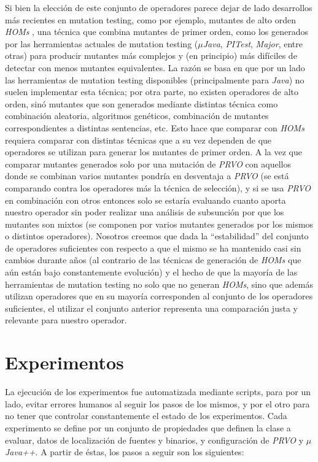 Si bien la elecci\'on de este conjunto de operadores parece dejar de lado desarrollos m\'as recientes en mutation testing, como por ejemplo, mutantes de alto orden \emph{HOMs} \cite{bibliography.mutation.highorder.Jia+09}, una t\'ecnica que combina mutantes de primer orden, como los generados por las herramientas actuales de mutation testing (\emph{$\mu$Java}, \emph{PITest}, \emph{Major}, entre otras) para producir mutantes m\'as complejos y (en principio) m\'as dif\'iciles de detectar con menos mutantes equivalentes. La raz\'on se basa en que por un lado las herramientas de mutation testing disponibles (principalmente para \emph{Java}) no suelen implementar esta t\'ecnica; por otra parte, no existen operadores de alto orden, sin\'o mutantes que son generados mediante distintas t\'ecnica como combinaci\'on aleatoria, algoritmos gen\'eticos, combinaci\'on de mutantes correspondientes a distintas sentencias, etc. Esto hace que comparar con \emph{HOMs} requiera comparar con distintas t\'ecnicas que a su vez dependen de que operadores se utilizan para generar los mutantes de primer orden. A la vez que comparar mutantes generados solo por una mutaci\'on de \emph{PRVO} con aquellos donde se combinan varios mutantes pondr\'ia en desventaja a \emph{PRVO} (se est\'a comparando contra los operadores m\'as la t\'ecnica de selecci\'on), y si se usa \emph{PRVO} en combinaci\'on con otros entonces solo se estar\'ia evaluando cuanto aporta nuestro operador sin poder realizar una an\'alisis de subsunci\'on por que los mutantes son mixtos (se componen por varios mutantes generados por los mismos o distintos operadores). Nosotros creemos que dada la ``estabilidad'' del conjunto de operadores suficientes con respecto a que el mismo se ha mantenido casi sin cambios durante a\~nos (al contrario de las t\'ecnicas de generaci\'on de \emph{HOMs} que a\'un est\'an bajo constantemente evoluci\'on) y el hecho de que la mayor\'ia de las herramientas de mutation testing no solo que no generan \emph{HOMs}, sino que adem\'as utilizan operadores que en su mayor\'ia corresponden al conjunto de los operadores suficientes, el utilizar el conjunto anterior representa una comparaci\'on justa y relevante para nuestro operador.

\section{Experimentos}
\label{sec:evaluation.steps}

La ejecuci\'on de los experimentos fue automatizada mediante scripts, para por un lado, evitar errores humanos al seguir los pasos de los mismos, y por el otro para no tener que controlar constantemente el estado de los experimentos. Cada experimento se define por un conjunto de propiedades que definen la clase a evaluar, datos de localizaci\'on de fuentes y binarios, y configuraci\'on de \emph{PRVO} y \emph{$\mu$Java++}. A partir de \'estas, los pasos a seguir son los siguientes:

